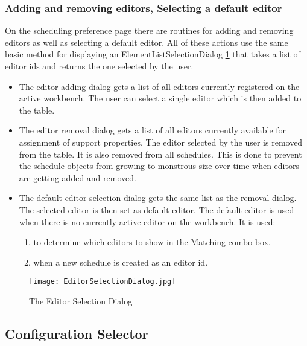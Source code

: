 \subsubsection{Adding and removing editors, Selecting a default editor}
On the scheduling preference page there are routines for adding and removing
editors as well as selecting a default editor.
All of these actions use the same basic method for displaying an ElementListSelectionDialog \ref{fig:EditorSelectionDialog}
that takes a list of editor ids and returns the one selected by the user.
\begin{itemize}
 \item The editor adding dialog gets a list of all editors currently registered on the
 active workbench. The user can select a single editor which is then added to the table.
 \item The editor removal dialog gets a list of all editors currently available for 
 assignment of support properties. The editor selected by the user is removed from the table.
 It is also removed from all schedules. This is done to prevent the schedule objects from growing
 to monstrous size over time when editors are getting added and removed.
 \item The default editor selection dialog gets the same list as the removal dialog. The selected
 editor is then set as default editor. The default editor is used when there is no currently active editor on the workbench.
  It is used:
  \begin{enumerate}
   \item to determine which editors to show in the Matching combo box.
   \item when a new schedule is created as an editor id.
  \end{enumerate}
\end{itemize}
\begin{figure}[EditorSelectionDialog]
  \centering
  \texttt{[image: EditorSelectionDialog.jpg]}
  \caption[Editor Selection Dialog]%
  {The Editor Selection Dialog\protect}
  \label{fig:EditorSelectionDialog}
\end{figure}

\subsection{Configuration Selector}
\label{section:ConfigurationSelector}

